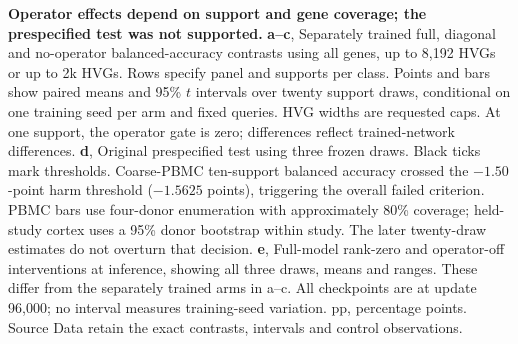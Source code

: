 \textbf{Operator effects depend on support and gene coverage; the prespecified test was not supported.} \textbf{a--c}, Separately trained full, diagonal and no-operator balanced-accuracy contrasts using all genes, up to 8,192 HVGs or up to 2k HVGs. Rows specify panel and supports per class. Points and bars show paired means and 95\% $t$ intervals over twenty support draws, conditional on one training seed per arm and fixed queries. HVG widths are requested caps. At one support, the operator gate is zero; differences reflect trained-network differences. \textbf{d}, Original prespecified test using three frozen draws. Black ticks mark thresholds. Coarse-PBMC ten-support balanced accuracy crossed the $-1.50$-point harm threshold ($-1.5625$ points), triggering the overall failed criterion. PBMC bars use four-donor enumeration with approximately 80\% coverage; held-study cortex uses a 95\% donor bootstrap within study. The later twenty-draw estimates do not overturn that decision. \textbf{e}, Full-model rank-zero and operator-off interventions at inference, showing all three draws, means and ranges. These differ from the separately trained arms in a--c. All checkpoints are at update 96,000; no interval measures training-seed variation. pp, percentage points. Source Data retain the exact contrasts, intervals and control observations.
